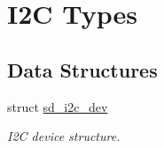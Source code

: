 \hypertarget{group___s_d___i2_c___types}{}\section{I2C Types}
\label{group___s_d___i2_c___types}
\subsection*{Data Structures}
\begin{DoxyCompactItemize}
\item 
struct \mbox{\hyperlink{structsd__i2c__dev}{sd\+\_\+i2c\+\_\+dev}}
\begin{DoxyCompactList}\small\item\em I2C device structure. \end{DoxyCompactList}\end{DoxyCompactItemize}

